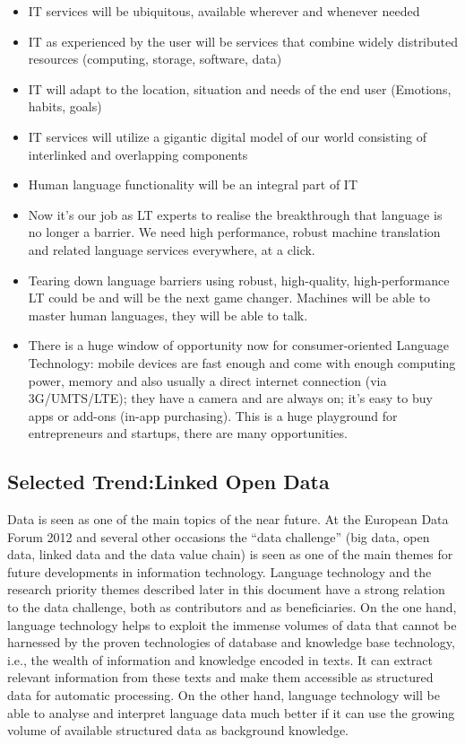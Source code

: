 \documentclass[10pt, plain]{../../metanetpaper}
\begin{document}
\begin{multicols}{2}
\begin{itemize}
\item IT services will be ubiquitous, available wherever and whenever needed
\item IT as experienced by the user will be services that combine widely distributed resources (computing, storage, software, data)
\item IT will adapt to the location, situation and needs of the end user (Emotions, habits, goals)
\item IT services will utilize a gigantic digital model of our world consisting of interlinked and overlapping components
\item Human language functionality will be an integral part of IT
\item Now it’s our job as LT experts to realise the breakthrough that language is no longer a barrier. We need high performance, robust machine translation and related language services everywhere, at a click.
\item Tearing down language barriers using robust, high-quality, high-performance LT could be and will be the next game changer. Machines will be able to master human languages, they will be able to talk.
\item There is a huge window of opportunity now for consumer-oriented Language Technology: mobile devices are fast enough and come with enough computing power, memory and also usually a direct internet connection (via 3G/UMTS/LTE); they have a camera and are always on; it’s easy to buy apps or add-ons (in-app purchasing). This is a huge playground for entrepreneurs and startups, there are many opportunities.
\end{itemize}

\subsection[Selected Trend: Linked Open Data]{Selected Trend:\newline Linked Open Data}
\label{sec:linked-data-open}

Data is seen as one of the main topics of the near future. At the European Data Forum 2012 and several other occasions the “data challenge” (big data, open data, linked data and the data value chain) is seen as one of the main themes for future developments in information technology. Language technology and the research priority themes described later in this document have a strong relation to the data challenge, both as contributors and as beneficiaries. On the one hand, language technology helps to exploit the immense volumes of data that cannot be harnessed by the proven technologies of database and knowledge base technology, i.e., the wealth of information and knowledge encoded in texts. It can extract relevant information from these texts and make them accessible as structured data for automatic processing. On the other hand, language technology will be able to analyse and interpret language data much better if it can use the growing volume of available structured data as background knowledge. 


\end{multicols}
\end{document}

